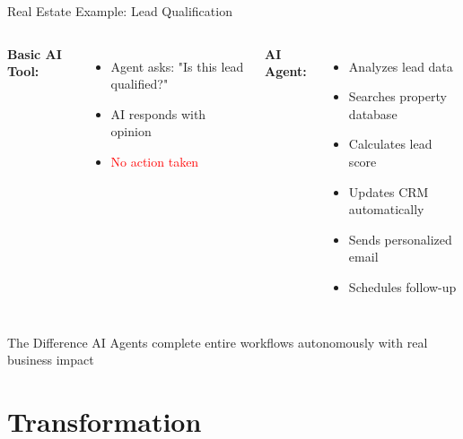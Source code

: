 \documentclass{beamer}
\begin{document}
\begin{frame}{Real Estate Example: Lead Qualification}
  \begin{columns}[onlytextwidth]
      \textbf{Basic AI Tool:}
      \begin{itemize}
        \item Agent asks: "Is this lead qualified?"
        \item AI responds with opinion
        \item \textcolor{red}{No action taken}
      \end{itemize}
    
      \textbf{AI Agent:}
      \begin{itemize}
        \item Analyzes lead data
        \item Searches property database
        \item Calculates lead score
        \item Updates CRM automatically
        \item Sends personalized email
        \item Schedules follow-up
      \end{itemize}
  \end{columns}
  
  \vspace{0.5cm}
  \begin{block}{The Difference}
    AI Agents complete entire workflows autonomously with real business impact
  \end{block}
\end{frame}

\section{Transformation}
\end{document}
